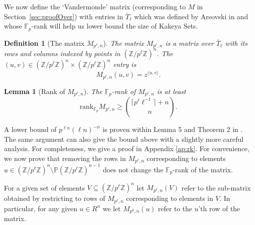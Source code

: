 \documentclass[11pt]{article}
\numberwithin{equation}{section}
\newtheorem{lem}[thm]{Lemma}
\newtheorem{define}[thm]{Definition}
\def\F{{\mathbb{F}}}
\def\Z{{\mathbb{Z}}}
\def\P{{\mathbb{P}}}
\begin{document}
We now define the `Vandermonde' matrix (corresponding to $M$ in Section~\ref{sec:proofOver}) with entries in $\overline{T}_{\ell}$ which was defined by Arsovski in \cite{arsovski2021padic} and whose $\F_p$-rank will help us lower bound the size of Kakeya Sets.

\begin{define}[The matrix $M_{p^\ell,n}$]
The matrix $M_{p^\ell,n}$ is a matrix over $\overline{T}_{\ell}$ with its rows and columns indexed by points in $(\Z/p^\ell\Z)^n$. The $(u,v)\in (\Z/p^\ell\Z)^n\times (\Z/p^\ell\Z)^n$ entry is
$$M_{p^\ell,n}(u,v)=z^{\langle u, v\rangle}.$$
\end{define}


\begin{lem}[Rank of $M_{p^\ell,n}$]\label{lem:1rank}
The $\F_p$-rank of $M_{p^\ell,n}$ is at least 
{\em $$\text{rank}_{\F_p} M_{p^\ell,n} \ge \binom{\lceil p^\ell \ell^{-1} \rceil +n}{n}.$$}
\end{lem}
A lower bound of $p^{\ell n} (\ell n)^{-n}$ is proven within Lemma 5 and Theorem 2 in \cite{arsovski2021padic}. The same argument can also give the bound above with a slightly more careful analysis. For completeness, we give a proof in Appendix \ref{ap:rk}. For convenience, we now prove that removing the rows in $M_{p^\ell,n}$ corresponding to elements $u\in (\Z/p^\ell\Z)^n\setminus\P (\Z/p^\ell\Z)^{n-1}$ does not change the $\F_p$-rank of the matrix. 

For a given set of elements $V\subseteq (\Z/p^\ell\Z)^{n}$ let $M_{p^\ell,n}(V)$ refer to the sub-matrix obtained by restricting to rows of $M_{p^\ell,n}$ corresponding to elements in $V$. In particular, for any given $u\in R^n$ we let $M_{p^k,n}(u)$ refer to the $u$'th row of the matrix.
\end{document}
